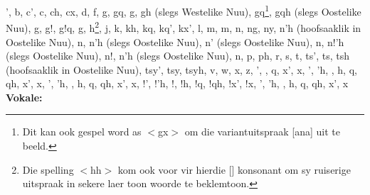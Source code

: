 ', b, c', c, ch, cx, d, f, g, gq, g\textipa{\textvertline},
g\textipa{\textvertline}h (slegs Westelike
N\textipa{\textvertline}uu), g\textipa{\textvertline}q\footnote{Dit
kan ook gespel word as $<$g\textipa{\textvertline}x$>$ om die
variantuitspraak [ana] uit te
beeld.}, g\textipa{\textvertline}qh (slegs Oostelike
N\textipa{\textvertline}uu), g\textipa{\textdoublevertline}, g!, g!q,
g\textipa{\textdoublebarpipe}, h\footnote{Die spelling $<$hh$>$ kom
ook voor vir hierdie [] konsonant om sy ruiserige uitspraak
in sekere laer toon woorde te beklemtoon.}, j, k, kh, kq, kq', kx', l,
m, m, n, ng, ny, n\textipa{\textvertline}'h (hoofsaaklik
in Oostelike N\textipa{\textvertline}uu), n\textipa{\textvertline},
n\textipa{\textdoublevertline}'h (slegs Oostelike
N\textipa{\textvertline}uu), n\textipa{\textdoublevertline}' (slegs
Oostelike N\textipa{\textvertline}uu), n\textipa{\textdoublevertline},
n!'h (slegs Oostelike N\textipa{\textvertline}uu), n!,
n\textipa{\textdoublebarpipe}'h (slegs Oostelike
N\textipa{\textvertline}uu), n\textipa{\textdoublebarpipe}, p, ph, r,
s, t, ts', ts, tsh (hoofsaaklik in Oostelike
N\textipa{\textvertline}uu), tsy', tsy, tsyh, v, w, x, z,
', , q, x',
x, \textipa{\textvertline}', \textipa{\textvertline}'h,
\textipa{\textvertline}, \textipa{\textvertline}h,
\textipa{\textvertline}q, \textipa{\textvertline}qh,
\textipa{\textvertline}x', \textipa{\textvertline}x,
\textipa{\textdoublevertline}', \textipa{\textdoublevertline}'h,
\textipa{\textdoublevertline}, \textipa{\textdoublevertline}h,
\textipa{\textdoublevertline}q, \textipa{\textdoublevertline}qh,
\textipa{\textdoublevertline}x', \textipa{\textdoublevertline}x, !',
!'h, !, !h, !q, !qh, !x', !x, \textipa{\textdoublebarpipe}',
\textipa{\textdoublebarpipe}'h, \textipa{\textdoublebarpipe},
\textipa{\textdoublebarpipe}h, \textipa{\textdoublebarpipe}q,
\textipa{\textdoublebarpipe}qh, \textipa{\textdoublebarpipe}x',
\textipa{\textdoublebarpipe}x\\

\textbf{Vokale:}

